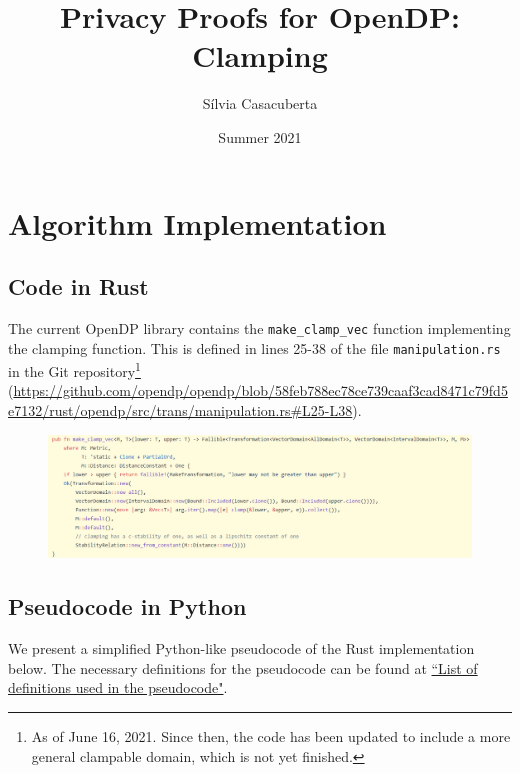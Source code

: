 \documentclass[11pt,a4paper]{article}
\title{Privacy Proofs for OpenDP: Clamping}
\author{S\'ilvia Casacuberta}
\date{Summer 2021}
\theoremstyle{definition}
\begin{document}
\maketitle

\tableofcontents

\section{Algorithm Implementation}


\subsection{Code in Rust}
The current OpenDP library contains the \texttt{make\_clamp\_vec} function implementing the clamping function. This is defined in lines 25-38 of the file \texttt{manipulation.rs} in the Git repository\footnote{As of June 16, 2021. Since then, the code has been updated to include a more general clampable domain, which is not yet finished.} (\url{https://github.com/opendp/opendp/blob/58feb788ec78ce739caaf3cad8471c79fd5e7132/rust/opendp/src/trans/manipulation.rs#L25-L38}).

\begin{figure}[ht]
    \includegraphics[width=16cm]{clamp_rust.png}
    \centering
    \label{fig:code}
\end{figure}


\subsection{Pseudocode in Python}\label{sec:pseudocode}
We present a simplified Python-like pseudocode of the Rust implementation below. The necessary definitions for the pseudocode can be found at \href{https://www.overleaf.com/project/60d215bf90b337ac02200a99}{``List of definitions used in the pseudocode"}. 
\end{document}
